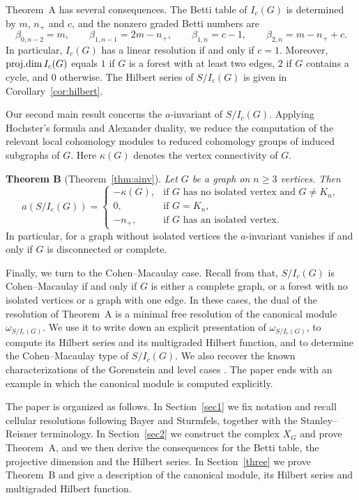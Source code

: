 \documentclass[12pt]{amsart}
\def\pd{\textup{proj.dim}}
\begin{document}
Theorem~A has several consequences. The Betti table of $I_c(G)$ is determined by $m$, $n_+$ and $c$, and the nonzero graded Betti numbers are
\[
\beta_{0,n-2}=m,\qquad \beta_{1,n-1}=2m-n_+,\qquad \beta_{1,n}=c-1,\qquad \beta_{2,n}=m-n_++c.
\]
In particular, $I_c(G)$ has a linear resolution if and only if $c=1$. Moreover, $\pd\, I_c(G)$ equals $1$ if $G$ is a forest with at least two edges, $2$ if $G$ contains a cycle, and $0$ otherwise. The Hilbert series of $S/I_c(G)$ is given in Corollary~\ref{cor:hilbert}.

Our second main result concerns the $a$-invariant of $S/I_c(G)$. Applying Hochster's formula and Alexander duality, we reduce the computation of the relevant local cohomology modules to reduced cohomology groups of induced subgraphs of $G$. Here $\kappa(G)$ denotes the vertex connectivity of $G$.

 \noindent\textbf{Theorem B} (Theorem~\ref{thm:ainv}).
\emph{Let $G$ be a graph on $n\ge3$ vertices. Then}
\[
a(S/I_c(G))=\begin{cases}-\kappa(G), & \text{if $G$ has no isolated vertex and $G\neq K_n$},\\ 0,&\text{if } G=K_n,\\ -n_+,&\text{if $G$ has an isolated vertex}.\end{cases}
\]
\smallskip
In particular, for a graph without isolated vertices the $a$-invariant vanishes if and only if $G$ is disconnected or complete.

Finally, we turn to the Cohen--Macaulay case. Recall from \cite{fm2025,hqm2026} that,  $S/I_c(G)$ is Cohen--Macaulay if and only if $G$ is either a complete graph, or a forest with no isolated vertices or a graph with one edge. In these cases, the dual of the resolution of Theorem~A is a minimal free resolution of the canonical module $\omega_{S/I_c(G)}$. We use it to write down an explicit presentation of $\omega_{S/I_c(G)}$, to compute its Hilbert series and its multigraded Hilbert function, and to determine the Cohen--Macaulay type of $S/I_c(G)$. We also recover the known characterizations of the Gorenstein and level cases \cite{fm2025,hqm2026}. The paper ends with an example in which the canonical module is computed explicitly.

The paper is organized as follows. In Section~\ref{sec1} we fix notation and recall cellular resolutions following Bayer and Sturmfels, together with the Stanley--Reisner terminology. In Section~\ref{sec2} we construct the complex $X_G$ and prove Theorem~A, and we then derive the consequences for the Betti table, the projective dimension and the Hilbert series. In Section~\ref{three} we prove Theorem~B and give a description of the canonical module, its Hilbert series and multigraded Hilbert function.
	
\end{document}
